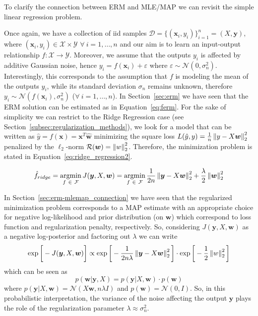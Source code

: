 To clarify the connection between ERM and MLE/MAP we can revisit the simple linear regression problem.

Once again, we have a collection of \ac{iid} samples $\mathcal{D}=\{(\bm{x}_i,y_i)\}_{i=1}^n = (X, \bm{y})$, where $(\bm{x}_i,y_i) \in \mathcal{X} \times \mathcal{Y}$ $\forall~i=1,\dots,n$ and our aim is to learn an input-output relationship $f: \mathcal{X} \rightarrow \mathcal{Y}$.
Moreover, we assume that the outputs $y_i$ is affected by additive Gaussian noise, hence $y_i = f(\bm{x}_i) + \varepsilon$ where $\varepsilon \sim \mathcal{N}(0,\sigma_n^2)$.
Interestingly, this corresponds to the assumption that $f$ is modeling the mean of the outputs $y_i$, while its standard deviation $\sigma_n$ remains unknown, therefore $y_i \sim \mathcal{N}(f(\bm{x}_i), \sigma_n^2)$ ($\forall~i=1,\dots,n$).
In Section~\ref{sec:erm} we have seen that the ERM solution can be estimated as in Equation~\ref{eq:ferm}. For the sake of simplicity we can restrict to the Ridge Regression  case (see Section~\ref{subsec:regularization_methods}), \ie we look for a model that can be written as $\hat y = f(\bm{x}) = \bm{x}^T \bm{ \hat w}$ minimizing the square loss $L(\hat y,y) = \frac{1}{n} \left\lVert y - X\bm{w}\right\rVert_2^2$ penalized by the $\ell_2$-norm $\mathcal{R}(\bm{w}) = \left\lVert w\right\rVert_2^2$.
Therefore, the minimization problem is stated in Equation~\eqref{eq:ridge_regression2}.

\begin{equation} \label{eq:ridge_regression2}
	\hat f_{ridge} = \mathop{\mathrm{argmin}}\limits_{f~\in~\mathcal{F}} J(\bm{y}, X, \bm{w}) = \mathop{\mathrm{argmin}}\limits_{f~\in~\mathcal{F}}\frac{1}{2n} \left\lVert\bm{y} - X\bm{w}\right\rVert_2^2+\frac{\lambda}{2}\left\lVert\bm{w}\right\rVert_2^2
\end{equation}

In Section~\ref{sec:erm-mlemap_connection} we have seen that the regularized minimization problem corresponds to a MAP estimate with an appropriate choice for negative log-likelihood and prior distribution (on $\bm{w}$) which correspond to loss function and regularization penalty, respectively. So, considering $J(\bm{y}, X, \bm{w})$ as a negative log-posterior and factoring out $\lambda$ we can write
$$
\exp{\bigg[-J(\bm{y}, X, \bm{w})\bigg]} \propto \exp \bigg[ -\frac{1}{2n\lambda} \left\lVert\bm{y}-X\bm{w}\right\rVert_2^2 \bigg] \cdot \exp{\bigg[-\frac{1}{2}\left\lVert w\right\rVert_2^2 \bigg]}
$$
which can be seen as
$$
p(\bm{w}|\bm{y},X) = p(\bm{y}|X,\bm{w}) \cdot p(\bm{w})
$$
where $p(\bm{y}|X,\bm{w}) = \mathcal{N}(X\bm{w},n \lambda I)$ and $p(\bm{w}) = \mathcal{N}(0,I)$. So, in this probabilistic interpretation, the variance of the noise affecting the output $\bm{y}$ plays the role of the regularization parameter $\lambda \approx \sigma_n^2$.


